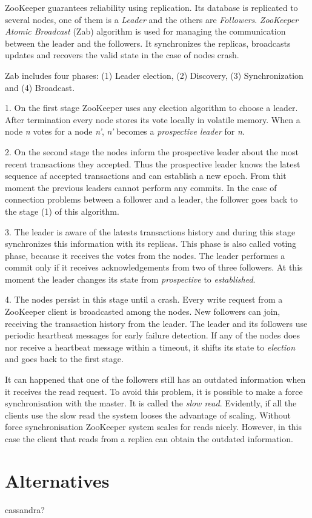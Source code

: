 ZooKeeper guarantees reliability using replication.
Its database is replicated to several nodes, one of them is a \textit{Leader} and the others are \textit{Followers}.
\textit{ZooKeeper Atomic Broadcast} (Zab) algorithm is used for managing the communication between the leader and the followers.
It synchronizes the replicas, broadcasts updates and recovers the valid state in the case of nodes crash.

Zab includes four phases: (1) Leader election, (2) Discovery, (3) Synchronization and (4) Broadcast.

1. On the first stage ZooKeeper uses any election algorithm to choose a leader.
After termination every node stores its vote locally in volatile memory.
When a node \textit{n} votes for a node \textit{n'}, \textit{n'} becomes a \textit{prospective leader} for \textit{n}.

2. On the second stage the nodes inform the prospective leader about the most recent transactions they accepted.
Thus the prospective leader knows the latest sequence af accepted transactions and can establish a new epoch.
From thit moment the previous leaders cannot perform any commits.
In the case of connection problems between a follower and a leader, the follower goes back to the stage (1) of this algorithm.

3. The leader is aware of the latests transactions history and during this stage synchronizes this information with its replicas.
This phase is also called voting phase, because it receives the votes from the nodes.
The leader performes a commit only if it receives acknowledgements from two of three followers.
At this moment the leader changes its state from \textit{prospective} to \textit{established}.

4. The nodes persist in this stage until a crash.
Every write request from a ZooKeeper client is broadcasted among the nodes.
New followers can join, receiving the transaction history from the leader.
The leader and its followers use periodic heartbeat messages for early failure detection.
If any of the nodes does nor receive a heartbeat message within a timeout, it shifts its state to \textit{election} and goes back to the first stage.

It can happened that one of the followers still has an outdated information when it receives the read request.
To avoid this problem, it is possible to make a force synchronisation with the master.
It is called the \textit{slow read}.
Evidently, if all the clients use the slow read the system looses the advantage of scaling.
Without force synchronisation ZooKeeper system scales for reads nicely. 
However, in this case the client that reads from a replica can obtain the outdated information.


\section{Alternatives}
cassandra?